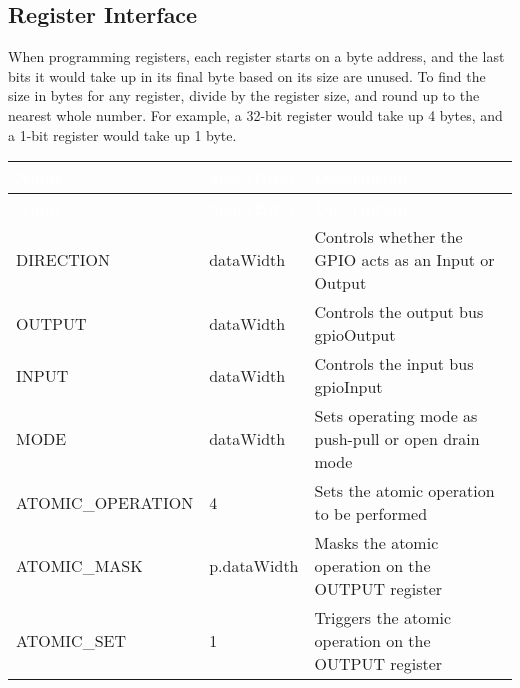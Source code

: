 \subsection{Register Interface}
 
When programming registers, each register starts on a byte address, and the last bits it would take up in its final byte based on its size are unused. To find the size in bytes for any register, divide by the register size, and round up to the nearest whole number. For example, a 32-bit register would take up 4 bytes, and a 1-bit register would take up 1 byte.
\renewcommand*{\arraystretch}{1.4}
\begingroup
\small
{} %
\begin{longtable}[H]{
  | p{}
  | p{}
  | p{} |
  }
  \hline
  \rowcolor{dark-gray}

  \textcolor{white}{\textbf{Name}} &   
  \textcolor{white}{\textbf{Size (Bits)}} &   
  \textcolor{white}{\textbf{Description}} \\ \hline \hline
  \endfirsthead

  \textcolor{white}{\textbf{Name}} &   
  \textcolor{white}{\textbf{Size (Bits)}} &   
  \textcolor{white}{\textbf{Description}} \\ \hline \hline
  \endhead

  
  DIRECTION  &   
  dataWidth &   
  Controls whether the GPIO acts as an Input or Output \\ \hline

  OUTPUT &   
  dataWidth &   
  Controls the output bus gpioOutput \\ \hline

  INPUT &   
  dataWidth &   
  Controls the input bus gpioInput \\ \hline

  MODE &   
  dataWidth &   
  Sets operating mode as push-pull or open drain mode \\ \hline

  ATOMIC\_OPERATION &   
  4 &   
  Sets the atomic operation to be performed \\ \hline

  ATOMIC\_MASK &   
  p.dataWidth &   
  Masks the atomic operation on the OUTPUT register \\ \hline

  ATOMIC\_SET &   
  1 &   
  Triggers the atomic operation on the OUTPUT register \\ \hline


\end{longtable}
